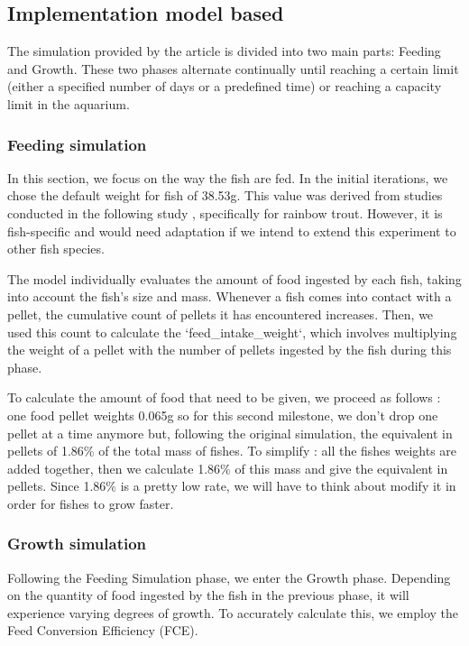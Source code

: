 \documentclass[9pt]{pnas-new}
\begin{document}
\subsection{Implementation model based}

The simulation provided by the article is divided into two main parts: Feeding and Growth. These two phases alternate continually until reaching a certain limit (either a specified number of days or a predefined time) or reaching a capacity limit in the aquarium.

\subsubsection{Feeding simulation}

In this section, we focus on the way the fish are fed. In the initial iterations, we chose the default weight for fish of 38.53g. This value was derived from studies conducted in the following study \cite{morales1994effects}, specifically for rainbow trout. However, it is fish-specific and would need adaptation if we intend to extend this experiment to other fish species.

The model individually evaluates the amount of food ingested by each fish, taking into account the fish's size and mass.
Whenever a fish comes into contact with a pellet, the cumulative count of pellets it has encountered increases. Then, we used this count to calculate the `feed\_intake\_weight`, which involves multiplying the weight of a pellet with the number of pellets ingested by the fish during this phase.

To calculate the amount of food that need to be given, we proceed as follows : one food pellet weights 0.065g so for this second milestone, we don't drop one pellet at a time anymore but, following the original simulation, the equivalent in pellets of 1.86\% of the total mass of fishes. To simplify : all the fishes weights are added together, then we calculate 1.86\% of this mass and give the equivalent in pellets. Since 1.86\% is a pretty low rate, we will have to think about modify it in order for fishes to grow faster.

\subsubsection{Growth simulation}

Following the Feeding Simulation phase, we enter the Growth phase. Depending on the quantity of food ingested by the fish in the previous phase, it will experience varying degrees of growth. To accurately calculate this, we employ the Feed Conversion Efficiency (FCE).
\end{document}
